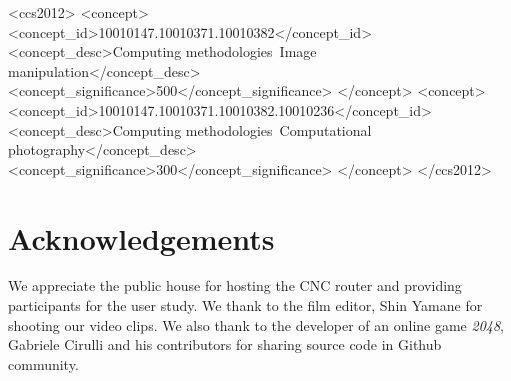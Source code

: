 \documentclass{acmsiggraph}
\begin{document}
\maketitle


\linenumbers

%
%
\begin{CCSXML}
<ccs2012>
<concept>
<concept_id>10010147.10010371.10010382</concept_id>
<concept_desc>Computing methodologies~Image manipulation</concept_desc>
<concept_significance>500</concept_significance>
</concept>
<concept>
<concept_id>10010147.10010371.10010382.10010236</concept_id>
<concept_desc>Computing methodologies~Computational photography</concept_desc>
<concept_significance>300</concept_significance>
</concept>
</ccs2012>
\end{CCSXML}


\keywordlist

\conceptlist

\printcopyright








\section*{Acknowledgements}
We appreciate the public house for hosting the CNC router and providing participants for the user study.
We thank to the film editor, Shin Yamane for shooting our video clips.
We also thank to the developer of an online game \textit{2048}, Gabriele Cirulli and his contributors for sharing source code in Github community.



\nocite{*}

\end{document}
